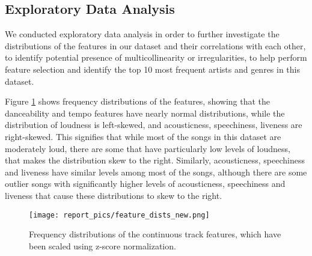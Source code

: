 \documentclass[times, twocolumn]{article}
\begin{document}
\subsection{Exploratory Data Analysis}
We conducted exploratory data analysis in order to further investigate the distributions of the features in our dataset and their correlations with each other, to identify potential presence of multicollinearity or irregularities, to help perform feature selection and identify the top 10 most frequent artists and genres in this dataset.

Figure \ref{graph:dists} shows frequency distributions of the features, showing that the danceability and tempo features have nearly normal distributions, while the distribution of loudness is left-skewed, and acousticness, speechiness, liveness are right-skewed. This signifies that while most of the songs in this dataset are moderately loud, there are some that have particularly low levels of loudness, that makes the distribution skew to the right. Similarly, acousticness, speechiness and liveness have similar levels among most of the songs, although there are some outlier songs with significantly higher levels of acousticness, speechiness and liveness that cause these distributions to skew to the right.

\begin{figure}[H]
    \centering
    \texttt{[image: report\_pics/feature\_dists\_new.png]}
    \caption{Frequency distributions of the continuous track features, which have been scaled using z-score normalization.}
    \label{graph:dists}
\end{figure}
\end{document}
